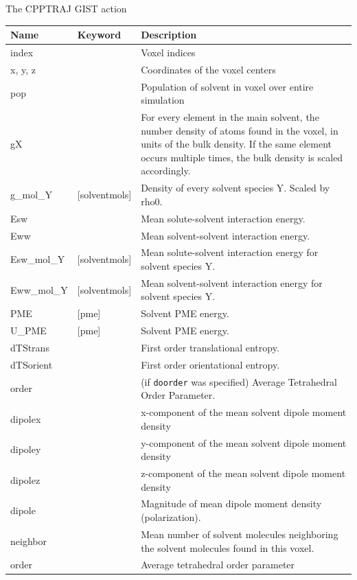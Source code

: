 \documentclass[9pt,tutorial]{livecoms}
\newcommand\inlinecode{\texttt}
\begin{document}
\begin{Checklists*}[h!]
\begin{checklist}{The CPPTRAJ GIST action}
\begin{tabularx}{\textwidth}{@{}l l X@{}}
\toprule
Name & Keyword & Description\\
\midrule
index & & Voxel indices \\
x, y, z & & Coordinates of the voxel centers \\
pop & & Population of solvent in voxel over entire simulation \\
gX &  & For every element in the main solvent, the number density of atoms found in the voxel, in units of the bulk density. If the same element occurs multiple times, the bulk density is scaled accordingly. \\
g\_mol\_Y & [solventmols]  & Density of every solvent species Y. Scaled by rho0. \\
Esw &  &  Mean solute-solvent interaction energy. \\
Eww &  & Mean solvent-solvent interaction energy. \\
Esw\_mol\_Y & [solventmols]  &  Mean solute-solvent interaction energy for solvent species Y. \\
Eww\_mol\_Y & [solventmols]  & Mean solvent-solvent interaction energy for solvent species Y. \\
PME & [pme] & Solvent PME energy. \\
U\_PME & [pme] & Solvent PME energy. \\
dTStrans &  & First order translational entropy. \\
dTSorient &  & First order orientational entropy. \\
order &  & (if \inlinecode{doorder} was specified) Average Tetrahedral Order Parameter. \\
dipolex &  & x-component of the mean solvent dipole moment density \\
dipoley &  & y-component of the mean solvent dipole moment density \\
dipolez &  & z-component of the mean solvent dipole moment density \\
dipole &  & Magnitude of mean dipole moment density (polarization). \\
neighbor &  & Mean number of solvent molecules neighboring the solvent molecules found in this voxel. \\
order & & Average tetrahedral order parameter \\

\end{tabularx}
\end{checklist}
\end{Checklists*}
\end{document}
